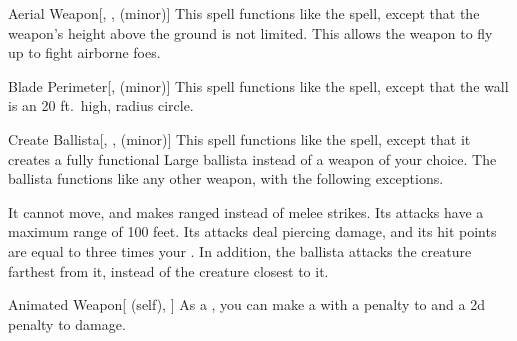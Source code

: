 \lowercase{\hypertarget{spell:Aerial Weapon}{}}\label{spell:Aerial Weapon}
\begin{freeability}[Rank 3]{\hypertarget{spell:Aerial Weapon}{Aerial Weapon}}[, ,  (minor)]
This spell functions like the  spell, except that the weapon's height above the ground is not limited.
This allows the weapon to fly up to fight airborne foes.
\end{freeability}
\vspace{0.25em}



\lowercase{\hypertarget{spell:Blade Perimeter}{}}\label{spell:Blade Perimeter}
\begin{freeability}[Rank 3]{\hypertarget{spell:Blade Perimeter}{Blade Perimeter}}[,  (minor)]
This spell functions like the  spell, except that the wall is an 20 ft.\ high, \areamed radius circle.
\end{freeability}
\vspace{0.25em}



\lowercase{\hypertarget{spell:Create Ballista}{}}\label{spell:Create Ballista}
\begin{freeability}[Rank 3]{\hypertarget{spell:Create Ballista}{Create Ballista}}[, ,  (minor)]
This spell functions like the  spell, except that it creates a fully functional Large ballista instead of a weapon of your choice.
The ballista functions like any other weapon, with the following exceptions.

It cannot move, and makes ranged  instead of melee strikes.
Its attacks have a maximum range of 100 feet.
Its attacks deal piercing damage, and its hit points are equal to three times your .
In addition, the ballista attacks the creature farthest from it, instead of the creature closest to it.
\end{freeability}
\vspace{0.25em}



\lowercase{\hypertarget{spell:Animated Weapon}{}}\label{spell:Animated Weapon}
\begin{attuneability}[Rank 4]{\hypertarget{spell:Animated Weapon}{Animated Weapon}}[ (self), ]
As a , you can make a  with a  penalty to  and a \minus2d penalty to damage.
\end{attuneability}
\vspace{0.25em}



